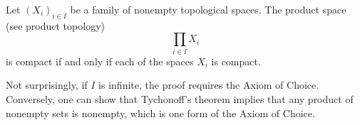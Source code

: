 \documentclass[12pt]{article}
\begin{document}
Let $(X_i)_{i\in I}$ be a family of nonempty topological spaces. The product space (see product topology)
$$\prod_{i\in I}X_i$$
is compact if and only if each of the spaces $X_i$ is compact.

Not surprisingly, if $I$ is infinite, the proof requires the Axiom of Choice. Conversely, one can show that Tychonoff's theorem implies that any product of nonempty sets is nonempty, which is one form of the Axiom of Choice.
\end{document}
